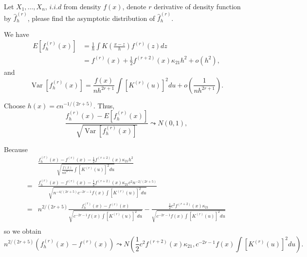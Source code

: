 \begin{problem}
    Let $X_1,\ldots,X_n,\, i.i.d$ from density $f(x)$, denote $r$ derivative of density function by $\hat{f}^{(r)}_h$, please find the asymptotic distribution of $\hat{f}^{(r)}_h$.
\end{problem}

\begin{solution}
    We have
    \begin{equation*}
        \begin{split}
            E \left[ f_{h}^{(r)}(x) \right]  & =\frac{1}{h} \int K\left(\frac{x-z}{h}\right) f^{(r)}(z) d z \\ 
            & = f^{(r)}(x)+\frac{1}{2} f^{(r+2)}(x) \kappa_{21} h^{2}+o\left(h^{2}\right),
        \end{split}
    \end{equation*}
    and
    \begin{equation*}
        \operatorname{Var}\left[f_{h}^{(r)}(x)\right] = \frac{f(x)}{n h^{2 r+1}} \int\left[K^{(r)}(u)\right]^{2} d u + o\left(\frac{1}{n h^{2 r+1}}\right).
    \end{equation*}

    Choose $h(x) = c n^{-1/(2r+5)}$.    
    Thus,
    \begin{equation*}
        \frac{f_{h}^{(r)}(x) -E \left[ f_{h}^{(r)}(x) \right]} {\sqrt{\operatorname{Var}\left[f_{h}^{(r)}(x)\right]}} \leadsto N(0,1),
    \end{equation*}
    
    Because
    \begin{equation*}
        \begin{split}
            & \frac{f_{h}^{(r)}(x) - f^{(r)}(x) - \frac{1}{2} f^{(r+2)}(x) \kappa_{21} h^{2}}{\sqrt{\frac{f(x)}{n h^{2 r+1}} \int\left[K^{(r)}(u)\right]^{2} d u}} \\
            = &  \frac{f_{h}^{(r)}(x) - f^{(r)}(x) - \frac{1}{2} f^{(r+2)}(x) \kappa_{21} c^{2} n^{-2/(2r+5)}}{\sqrt{n^{-4/ (2 r+5)} c^{-2r-1} f(x) \int\left[K^{(r)}(u)\right]^{2} d u}} \\
            = & n^{2/ (2 r+5)} \frac{f_{h}^{(r)}(x) - f^{(r)}(x)}{\sqrt{c^{-2r-1} f(x) \int\left[K^{(r)}(u)\right]^{2} d u}} - \frac{\frac{1}{2} c^{2} f^{(r+2)}(x) \kappa_{21}}{\sqrt{ c^{-2r-1} f(x) \int\left[K^{(r)}(u)\right]^{2} d u}}\\
        \end{split}
    \end{equation*}
    so we obtain
    \begin{equation*}
        n^{2/ (2 r+5)} \left( f_{h}^{(r)}(x) - f^{(r)}(x) \right) \leadsto N\left( \frac{1}{2} c^{2} f^{(r+2)}(x) \kappa_{21}, c^{-2r-1} f(x) \int\left[K^{(r)}(u)\right]^{2} d u\right).
    \end{equation*}
\end{solution}


